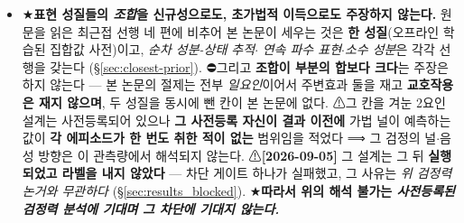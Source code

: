 \documentclass[11pt]{report}
\numberwithin{equation}{chapter}
\numberwithin{figure}{chapter}
\numberwithin{table}{chapter}
\begin{document}
\begin{itemize}
        하네스는 프레임의 신뢰 가중을 \textbf{항등적으로 $1$} 로 만들고 그 값에서
        가중 손실은 무가중 손실과 \textbf{비트 동일}이므로, 이 개입은 실측에서
        \textbf{구조적으로 무연산이며 측정 자체가 불가능}하다(\S\ref{sec:ladder}).
        ⛔따라서 이 판정을 실측 쪽에서 \emph{``측정했다''}고 쓰지 않는다.
        ⚠\textbf{그리고 이 배치는 blind 가 아니었다} --- 설계 셀 하나($48$ 중 $1$)를
        저자를 포함한 세 사람이 런 전에 보았고 그 셀의 방향이 최종 판정과 같았다.
        문턱$\cdot$팔$\cdot$해석 규칙은 그 노출 이전에 코드로 고정되었고 노출된 $1$표는
        어느 라벨도 만들지 못하나, \textbf{결과가 그 방향과 일치했다는 사실이 노출을
        소급 정당화하지 않으므로 공시를 남긴다}(\S\ref{sec:ablation_conf}).

  \item ★\textbf{표현 성질들의 \emph{조합}을 신규성으로도, 초가법적 이득으로도 주장하지
        않는다.} 원문을 읽은 최근접 선행 네 편에 비추어 본 논문이 세우는 것은
        \textbf{한 성질}(오프라인 학습된 집합값 사전)이고, \emph{순차 성분-상태 추적}$\cdot$
        \emph{연속 파수 표현}$\cdot$\emph{소수 성분}은 각각 선행을 갖는다
        (\S\ref{sec:closest-prior}).
        ⛔그리고 \textbf{조합이 부분의 합보다 크다}는 주장은 하지 않는다 --- 본 논문의
        절제는 전부 \emph{일요인}이어서 주변효과 둘을 재고 \textbf{교호작용은 재지
        않으며}, 두 성질을 동시에 뺀 칸이 본 논문에 없다.
        ⚠그 칸을 겨눈 2요인 설계는 사전등록되어 있으나 \textbf{그 사전등록 자신이 결과
        이전에} 가법 널이 예측하는 값이 \textbf{각 에피소드가 한 번도 취한 적이 없는}
        범위임을 적었다 ⟹ 그 검정의 널$\cdot$음성 방향은 이 관측량에서 해석되지 않는다.
        ⚠\textbf{[2026-09-05]} 그 설계는 그 뒤 \textbf{실행되었고 라벨을 내지 않았다}
        --- 차단 게이트 하나가 실패했고, 그 사유는 \emph{위 검정력 논거와 무관하다}
        (\S\ref{sec:results_blocked}). ★\textbf{따라서 위의 해석 불가는 \emph{사전등록된
        검정력 분석에 기대며 그 차단에 기대지 않는다.}}
\end{itemize}
\end{document}
